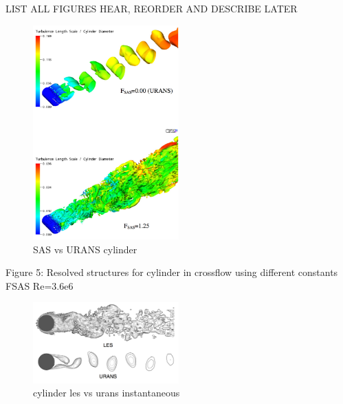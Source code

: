 \documentclass[journal]{new-aiaa}
\begin{document}
LIST ALL FIGURES HEAR, REORDER AND DESCRIBE LATER


\begin{figure}[H]
\begin{center}
\includegraphics[width=0.5\textwidth]{Images/logan/menter2005scaleadaptive_cylinderwake2.pdf}
\caption{ SAS vs URANS cylinder \cite{menter2005scaleadaptive} }
\label{fig:sasvsuranscylinder}
\end{center}
\end{figure}

Figure 5: Resolved structures for cylinder in crossflow using different constants FSAS Re=3.6e6




\begin{figure}[H]
\begin{center}
\includegraphics[width=0.5\textwidth]{Images/logan/catalano_2003numerical_UnsteadyURANSvsLES.pdf}
\caption{ cylinder les vs urans instantaneous \cite{catalano2003numerical} }
\label{fig:lesvsuranscylinderinstant}
\end{center}
\end{figure}
\end{document}
